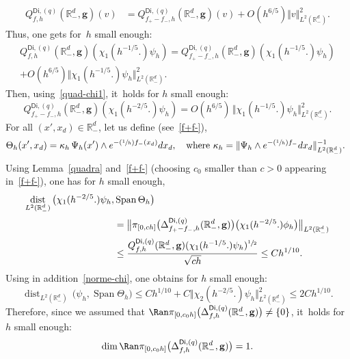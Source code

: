 \documentclass[JEP,XML,SOM,Unicode,NoEqCountersInSection,NoFloatCountersInSection,published]{cedram}
\newcommand{\Psfrac}[2]{(\sfrac{#1}{#2})}
\DeclareMathOperator{\dist}{dist}
\DeclareMathOperator{\Span}{Span}
\newcommand{\mbf}[1]{\mathbf{#1}}
\theoremstyle{plain}
\theoremstyle{definition}
\begin{document}
\begin{align}
\label{eq.=forme}
Q_{f,h}^{\mathsf{Di},(q)}(\mathbb R^d_-, { \mbf g}) (v)&=Q_{f_+-f_-,h}^{\mathsf{Di},(q)}(\mathbb R^d_-, { \mbf g}) (v) + O(h^{6/5}) \Vert v \Vert_{L^2(\mathbb R^d_-)}^2.
\end{align}
Thus, one gets for~$h$ small enough:
\begin{multline*}
Q_{f,h}^{\mathsf{Di},(q)}(\mathbb R^d_-, { \mbf g}) (\chi_1(h^{-1/5 }.) \psi_h)=Q_{f_+-f_-,h}^{\mathsf{Di},(q)}(\mathbb R^d_-, { \mbf g}) (\chi_1(h^{-1/5 }.) \psi_h) \\
+ O(h^{ 6/5}) \big \Vert \chi_1(h^{-1/5 }.) \psi_h \big \Vert_{L^2(\mathbb R^d_-)}^2.
\end{multline*}
Then, using~\eqref{quad-chi1}, it~holds for $h$ small enough:
\[
Q_{f_+-f_-,h}^{\mathsf{Di},(q)}(\mathbb R^d_-, { \mbf g}) (\chi_1(h^{-2/5 }.) \psi_h)=O(h^{6/5})\, \big\Vert \chi_1(h^{-1/5 }.) \psi_h \big\Vert_{L^2(\mathbb R_-^d)}^2.
\]
For all $(x',x_d)\in \mathbb R^d_-$, let us define (see~\eqref{f+f-}),
\[
\Theta_h(x',x_d)=\kappa_h\, \Psi_h(x')\wedge e^{-\Psfrac 1h f_-(x_d)}dx_d, \quad\text{where $\kappa_h= \Vert \Psi_h\wedge e^{-\Psfrac 1h f_-}dx_d\Vert_{L^2(\mathbb R^d_-)}^{-1}$. }
\]
Using Lemma~\ref{quadra} and~\eqref{f+f-} (choosing $c_0$ smaller than $c>0$ appearing in~\eqref{f+f-}), one has for $h$ small enough,
\begin{align*}
\dist_{L^2(\mathbb R_-^d)}\, \bigl(\chi_1(h^{-2/5 }.) \psi_h,&\Span \Theta_h\bigr)\\
&=\big \Vert \pi_{[0,ch]}\bigl(\Delta_{f_+-f_-,h}^{\mathsf{Di},(q)}(\mathbb R_-^d, { \mbf g})\bigr)\bigl(\chi_1(h^{-2/5 }.)\phi_h \bigr)\big \Vert_{L^2(\mathbb R^d_-)}\\
&\le \frac{ Q_{f,h}^{\mathsf{Di},(q)}(\mathbb R^d_-, { \mbf g}) (\chi_1(h^{-1/5 }.) \psi_h)^{\sfrac12}}{\sqrt{ch}} \le Ch^{{1}/{10}}.
\end{align*}
Using in addition~\eqref{norme-chi}, one obtains for $h$ small enough:
\[
\dist_{L^2(\mathbb R_-^d)}\, \bigl(\psi_h,\Span \Theta_h\bigr)\le Ch^{ {1}/{10}} + C \Vert \chi_2(h^{-2/5 }.) \psi_h \Vert_{L^2(\mathbb R_-^d)}^2 \le 2Ch^{ {1}/{10}}.
\]
Therefore, since we assumed that $\Ran \pi _{[0,c_0h]}\bigl(\Delta_{f,h}^{\mathsf{Di},(q)}(\mathbb R_-^d, \mbf g) \bigr) \neq \{0\}$, it~holds for $h$ small enough:
\[
\dim \Ran \pi_{[0,c_0h]}\bigl(\Delta_{f,h}^{\mathsf{Di},(q)}(\mathbb R_-^d, \mbf g)\bigr)=1.
\]
\end{document}
